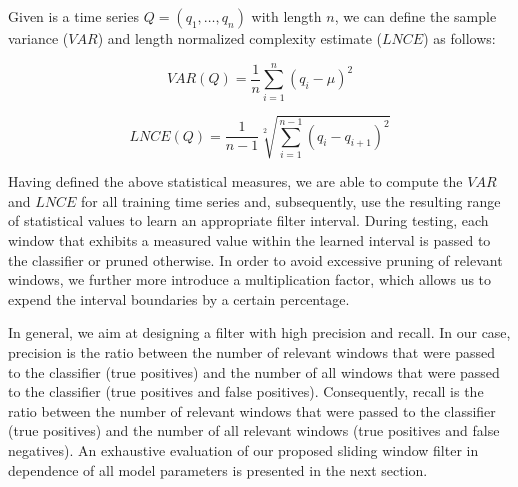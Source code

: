 Given is a time series $Q = (q_1, \dots, q_n)$ with length $n$, we can define the sample variance ($VAR$) and length normalized complexity estimate ($LNCE$) as follows:

\begin{equation*}
    VAR(Q) = \frac{1}{n}\sum \limits_{i=1}^{n} (q_i - \mu)^2
\end{equation*}

\begin{equation*}
    LNCE(Q) = \frac{1}{n-1}\sqrt[2]{\sum \limits_{i=1}^{n-1} (q_i - q_{i + 1})^2}
\end{equation*}

Having defined the above statistical measures, we are able to compute the $VAR$ and $LNCE$ for all training time series and, subsequently, use the resulting range of statistical values to learn an appropriate filter interval. During testing, each window that exhibits a measured value within the learned interval is passed to the classifier or pruned otherwise. In order to avoid excessive pruning of relevant windows, we further more introduce a multiplication factor, which allows us to expend the interval boundaries by a certain percentage.

In general, we aim at designing a filter with high precision and recall. In our case, precision is the ratio between the number of relevant windows that were passed to the classifier (true positives) and the number of all windows that were passed to the classifier (true positives and false positives). Consequently, recall is the ratio between the number of relevant windows that were passed to the classifier (true positives) and the number of all relevant windows (true positives and false negatives). An exhaustive evaluation of our proposed sliding window filter in dependence of all model parameters is presented in the next section.
